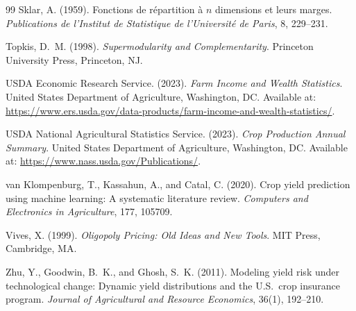 \documentclass[12pt,review,authoryear]{elsarticle}
\numberwithin{equation}{section}
\begin{document}
\begin{thebibliography}{99}
Sklar, A. (1959).
\newblock Fonctions de r\'{e}partition \`{a} $n$ dimensions et leurs marges.
\newblock \emph{Publications de l'Institut de Statistique de l'Universit\'{e} de Paris}, 8, 229--231.

Topkis, D.~M. (1998).
\newblock \emph{Supermodularity and Complementarity}.
\newblock Princeton University Press, Princeton, NJ.

USDA Economic Research Service. (2023).
\newblock \emph{Farm Income and Wealth Statistics}.
\newblock United States Department of Agriculture, Washington, DC.
\newblock Available at: \url{https://www.ers.usda.gov/data-products/farm-income-and-wealth-statistics/}.

USDA National Agricultural Statistics Service. (2023).
\newblock \emph{Crop Production Annual Summary}.
\newblock United States Department of Agriculture, Washington, DC.
\newblock Available at: \url{https://www.nass.usda.gov/Publications/}.

van Klompenburg, T., Kassahun, A., and Catal, C. (2020).
\newblock Crop yield prediction using machine learning: A systematic literature review.
\newblock \emph{Computers and Electronics in Agriculture}, 177, 105709.

Vives, X. (1999).
\newblock \emph{Oligopoly Pricing: Old Ideas and New Tools}.
\newblock MIT Press, Cambridge, MA.

Zhu, Y., Goodwin, B.~K., and Ghosh, S.~K. (2011).
\newblock Modeling yield risk under technological change: Dynamic yield distributions and the U.S.\ crop insurance program.
\newblock \emph{Journal of Agricultural and Resource Economics}, 36(1), 192--210.

\end{thebibliography}
\end{document}
